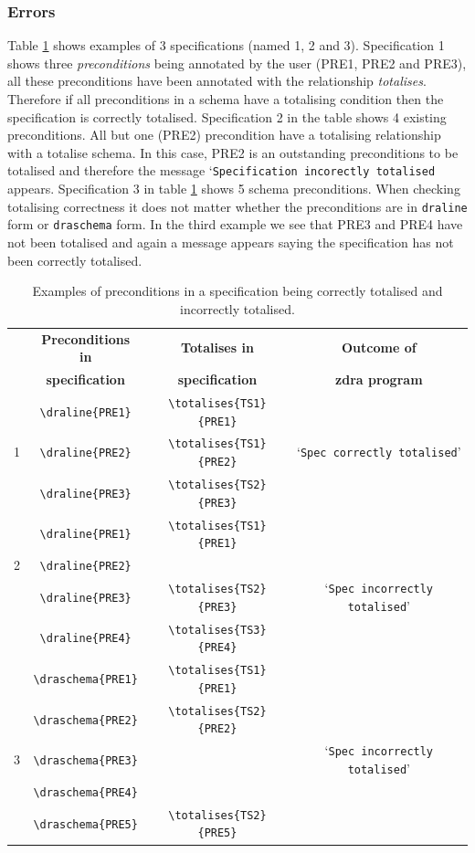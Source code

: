 \subsubsection{Errors}
\label{subsubsec:zdra_toterrors}

Table \ref{tab:totalisecorrect} shows examples of 3 specifications (named 1, 2
and 3). Specification 1 shows three \emph{preconditions} being annotated by the
user (PRE1, PRE2 and PRE3), all these preconditions have been annotated with the
relationship \emph{totalises}. Therefore if all preconditions in a schema have a
totalising condition then the specification is correctly totalised.
Specification 2 in the table shows 4 existing preconditions. All but one (PRE2)
precondition have a totalising relationship with a totalise schema. In this
case, PRE2 is an outstanding preconditions to be totalised and therefore the
message `\texttt{Specification incorectly totalised} appears. Specification 3 in
table \ref{tab:totalisecorrect} shows 5 schema preconditions. When checking
totalising correctness it does not matter whether the preconditions are in
\verb|draline| form or \verb|draschema| form. In the third example we see that
PRE3 and PRE4 have not been totalised and again a message appears saying the
specification has not been correctly totalised.

\begin{table}[H]
\begin{tabular}{|c|c|c|c|}
\hline
& \textbf{Preconditions in} & \textbf{Totalises in} & \textbf{Outcome of} \\
& \textbf{specification} & \textbf{specification} & \textbf{\gls{zdra} program}
\\
\hline
\hline
& \verb|\draline{PRE1}| & \verb|\totalises{TS1}{PRE1}| & \\
1 & \verb|\draline{PRE2}| & \verb|\totalises{TS1}{PRE2}| & `\texttt{Spec
correctly totalised}' \\
& \verb|\draline{PRE3}| & \verb|\totalises{TS2}{PRE3}|& \\
\hline
& \verb|\draline{PRE1}| & \verb|\totalises{TS1}{PRE1}| &  \\
2 & \verb|\draline{PRE2}| & & \\
& \verb|\draline{PRE3}| & \verb|\totalises{TS2}{PRE3}|& `\texttt{Spec
incorrectly totalised}' \\
& \verb|\draline{PRE4}| & \verb|\totalises{TS3}{PRE4}|& \\
\hline
& \verb|\draschema{PRE1}| & \verb|\totalises{TS1}{PRE1}| &  \\
 & \verb|\draschema{PRE2}| & \verb|\totalises{TS2}{PRE2}| & \\
3 & \verb|\draschema{PRE3}| & & `\texttt{Spec incorrectly totalised}' \\
& \verb|\draschema{PRE4}| & & \\
& \verb|\draschema{PRE5}| & \verb|\totalises{TS2}{PRE5}|  & \\
\hline
\end{tabular}
\caption{\label{tab:totalisecorrect} Examples of preconditions in a specification being correctly totalised and incorrectly totalised.}
\end{table}

